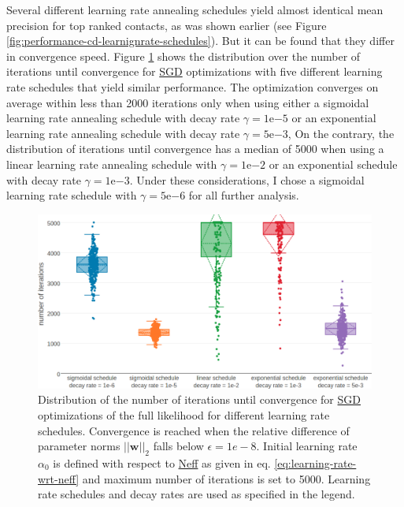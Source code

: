 \documentclass[11pt,a4paper,twoside]{book}
\newcommand{\eq}{\!=\!}
\newcommand{\w}{\mathbf{w}}
\theoremstyle{definition}
\theoremstyle{definition}
\theoremstyle{remark}
\begin{document}
Several different learning rate annealing schedules yield almost
identical mean precision for top ranked contacts, as was shown earlier
(see Figure \ref{fig:performance-cd-learnignrate-schedules}). But it can
be found that they differ in convergence speed. Figure
\ref{fig:distribution-num-iterations} shows the distribution over the
number of iterations until convergence for
\protect\hyperlink{abbrev}{SGD} optimizations with five different
learning rate schedules that yield similar performance. The optimization
converges on average within less than 2000 iterations only when using
either a sigmoidal learning rate annealing schedule with decay rate
\(\gamma \eq 1\mathrm{e}{-5}\) or an exponential learning rate annealing
schedule with decay rate \(\gamma \eq 5\mathrm{e}{-3}\), On the
contrary, the distribution of iterations until convergence has a median
of 5000 when using a linear learning rate annealing schedule with
\(\gamma \eq 1\mathrm{e}{-2}\) or an exponential schedule with decay
rate \(\gamma \eq 1\mathrm{e}{-3}\). Under these considerations, I chose
a sigmoidal learning rate schedule with \(\gamma \eq 5\mathrm{e}{-6}\)
for all further analysis.












\begin{figure}

{\centering \includegraphics[width=1\linewidth]{img/full_likelihood/sgd/distribution_numiterations_against_selected_learningrate_schedules} 

}

\caption{Distribution of the number of
iterations until convergence for \protect\hyperlink{abbrev}{SGD}
optimizations of the full likelihood for different learning rate
schedules. Convergence is reached when the relative difference of
parameter norms \(||\w||_2\) falls below \(\epsilon \eq 1e-8\). Initial
learning rate \(\alpha_0\) is defined with respect to
\protect\hyperlink{abbrev}{Neff} as given in eq.
\eqref{eq:learning-rate-wrt-neff} and maximum number of iterations is set
to 5000. Learning rate schedules and decay rates are used as specified
in the legend.}\label{fig:distribution-num-iterations}
\end{figure}
\end{document}
